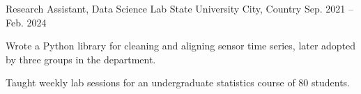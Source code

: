 \cventry
  {Research Assistant, Data Science Lab}      %
  {State University}                          %
  {City, Country}                             %
  {Sep. 2021 -- Feb. 2024}                    %
  {
    \begin{cvitems}
      \item {Wrote a Python library for cleaning and aligning sensor time
      series, later adopted by three groups in the department.}
      \item {Taught weekly lab sessions for an undergraduate statistics
      course of 80 students.}
    \end{cvitems}
  }
